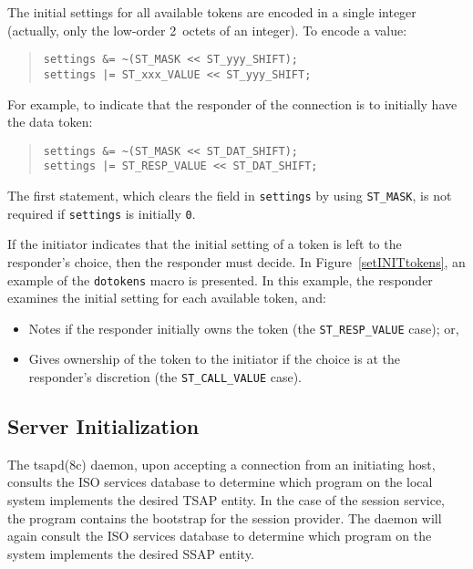 The initial settings for all available tokens are encoded in a single integer
(actually, only the low-order 2~octets of an integer).
To encode a value:
\begin{quote}\small\begin{verbatim}
settings &= ~(ST_MASK << ST_yyy_SHIFT);
settings |= ST_xxx_VALUE << ST_yyy_SHIFT;
\end{verbatim}\end{quote}
For example,
to indicate that the responder of the connection is to initially have the
data token:
\begin{quote}\small\begin{verbatim}
settings &= ~(ST_MASK << ST_DAT_SHIFT);
settings |= ST_RESP_VALUE << ST_DAT_SHIFT;
\end{verbatim}\end{quote}
The first statement,
which clears the field in \verb"settings" by using \verb"ST_MASK",
is not required if \verb"settings" is initially \verb"0".

If the initiator indicates that the initial setting of a token is left to
the responder's choice,
then the responder must decide.
In Figure~\ref{setINITtokens},
an example of the \verb"dotokens" macro is presented.
In this example,
the responder examines the initial setting for each available token,
and:
\begin{itemize}
\item	Notes if the responder initially owns the token
	(the \verb"ST_RESP_VALUE" case); or,
\item	Gives ownership of the token to the initiator if the choice is
	at the responder's discretion
	(the \verb"ST_CALL_VALUE" case).
\end{itemize}

\subsection	{Server Initialization}
The \man tsapd(8c) daemon,
upon accepting a connection from an initiating host,
consults the ISO services database to determine which program
on the local system implements the desired TSAP entity.
In the case of the session service,
the  program contains the bootstrap for the session provider.
The daemon will again consult the ISO services database to determine which
program on the system implements the desired SSAP entity.

